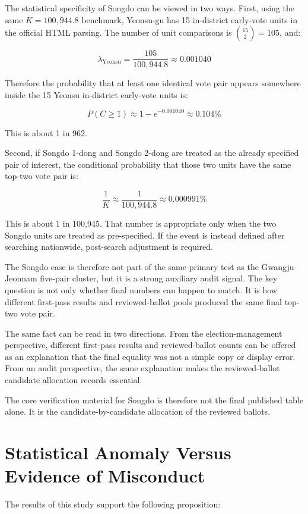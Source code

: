 \documentclass[preprint]{../ieie/IEIE}
\begin{document}
The statistical specificity of Songdo can be viewed in two ways. First, using the same \(K=100,944.8\) benchmark, Yeonsu-gu has 15 in-district early-vote units in the official HTML parsing. The number of unit comparisons is \(\binom{15}{2}=105\), and:

\[
\lambda_{\text{Yeonsu}} = \frac{105}{100,944.8} \approx 0.001040
\]

Therefore the probability that at least one identical vote pair appears somewhere inside the 15 Yeonsu in-district early-vote units is:

\[
P(C \ge 1) \approx 1-e^{-0.001040} \approx 0.104\%
\]

This is about 1 in 962.

Second, if Songdo 1-dong and Songdo 2-dong are treated as the already specified pair of interest, the conditional probability that those two units have the same top-two vote pair is:

\[
\frac{1}{K} \approx \frac{1}{100,944.8} \approx 0.000991\%
\]

This is about 1 in 100,945. That number is appropriate only when the two Songdo units are treated as pre-specified. If the event is instead defined after searching nationwide, post-search adjustment is required.

The Songdo case is therefore not part of the same primary test as the Gwangju-Jeonnam five-pair cluster, but it is a strong auxiliary audit signal. The key question is not only whether final numbers can happen to match. It is how different first-pass results and reviewed-ballot pools produced the same final top-two vote pair.

The same fact can be read in two directions. From the election-management perspective, different first-pass results and reviewed-ballot counts can be offered as an explanation that the final equality was not a simple copy or display error. From an audit perspective, the same explanation makes the reviewed-ballot candidate allocation records essential.

The core verification material for Songdo is therefore not the final published table alone. It is the candidate-by-candidate allocation of the reviewed ballots.

\section{Statistical Anomaly Versus Evidence of Misconduct}

The results of this study support the following proposition:
\end{document}
